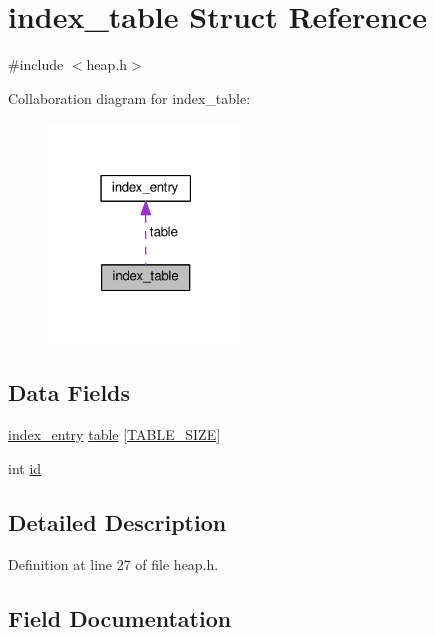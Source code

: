 \hypertarget{structindex__table}{}\section{index\+\_\+table Struct Reference}
\label{structindex__table}


{\ttfamily \#include $<$heap.\+h$>$}



Collaboration diagram for index\+\_\+table\+:\nopagebreak
\begin{figure}[H]
\begin{center}
\leavevmode
\includegraphics[width=147pt]{structindex__table__coll__graph}
\end{center}
\end{figure}
\subsection*{Data Fields}
\begin{DoxyCompactItemize}
\item 
\hyperlink{structindex__entry}{index\+\_\+entry} \hyperlink{structindex__table_ae69e0312bad59289ac303989d06c565d}{table} \mbox{[}\hyperlink{heap_8h_a032503e76d6f69bc67e99e909c8125da}{T\+A\+B\+L\+E\+\_\+\+S\+I\+ZE}\mbox{]}
\item 
int \hyperlink{structindex__table_a6e0e8e27a6a47e8ae2078b6fa447087f}{id}
\end{DoxyCompactItemize}


\subsection{Detailed Description}


Definition at line 27 of file heap.\+h.



\subsection{Field Documentation}
